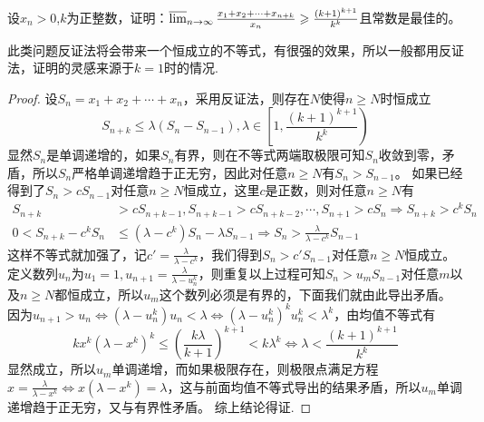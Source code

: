 \documentclass[../../main.tex]{subfiles}%
\begin{document}
\begin{example}
设\(x_n>0\),\(k\)为正整数，证明：\(\varlimsup_{n\rightarrow\infty}\frac{x_1 + x_2+\cdots + x_{n + k}}{x_n}\geqslant \frac{(k + 1)^{k + 1}}{k^k}\)且常数是最佳的。
\end{example}
\begin{note}
此类问题反证法将会带来一个恒成立的不等式，有很强的效果，所以一般都用反证法，证明的灵感来源于\(k = 1\)时的情况.
\end{note}
\begin{proof}

设\(S_n=x_1 + x_2+\cdots + x_n\)，采用反证法，则存在\(N\)使得\(n\geqslant  N\)时恒成立
\[S_{n + k}\leqslant \lambda(S_n - S_{n - 1}),\lambda\in\left[1,\frac{(k + 1)^{k + 1}}{k^k}\right)\]
显然\(S_n\)是单调递增的，如果\(S_n\)有界，则在不等式两端取极限可知\(S_n\)收敛到零，矛盾，所以\(S_n\)严格单调递增趋于正无穷，因此对任意\(n\geqslant  N\)有\(S_n>S_{n - 1}\)。
如果已经得到了\(S_n>cS_{n - 1}\)对任意\(n\geqslant  N\)恒成立，这里\(c\)是正数，则对任意\(n\geqslant  N\)有
\begin{align*}
S_{n + k}&>cS_{n + k - 1},S_{n + k - 1}>cS_{n + k - 2},\cdots,S_{n + 1}>cS_n\Rightarrow S_{n + k}>c^kS_n\\
0<S_{n + k}-c^kS_n&\leqslant (\lambda - c^k)S_n-\lambda S_{n - 1}\Rightarrow S_n>\frac{\lambda}{\lambda - c^k}S_{n - 1}
\end{align*}
这样不等式就加强了，记\(c'=\frac{\lambda}{\lambda - c^k}\)，我们得到\(S_n>c'S_{n - 1}\)对任意\(n\geqslant  N\)恒成立。
定义数列\(u_n\)为\(u_1 = 1,u_{n + 1}=\frac{\lambda}{\lambda - u_n^k}\)，则重复以上过程可知\(S_n>u_mS_{n - 1}\)对任意\(m\)以及\(n\geqslant  N\)都恒成立，所以\(u_m\)这个数列必须是有界的，下面我们就由此导出矛盾。
因为\(u_{n + 1}>u_n\Leftrightarrow(\lambda - u_n^k)u_n<\lambda\Leftrightarrow(\lambda - u_n^k)^ku_n^k<\lambda^k\)，由均值不等式有
\[kx^k(\lambda - x^k)^k\leqslant \left(\frac{k\lambda}{k + 1}\right)^{k + 1}<k\lambda^k\Leftrightarrow\lambda<\frac{(k + 1)^{k + 1}}{k^k}\]
显然成立，所以\(u_m\)单调递增，而如果极限存在，则极限点满足方程\(x=\frac{\lambda}{\lambda - x^k}\Leftrightarrow x(\lambda - x^k)=\lambda\)，这与前面均值不等式导出的结果矛盾，所以\(u_m\)单调递增趋于正无穷，又与有界性矛盾。
综上结论得证.

\end{proof}
\end{document}
